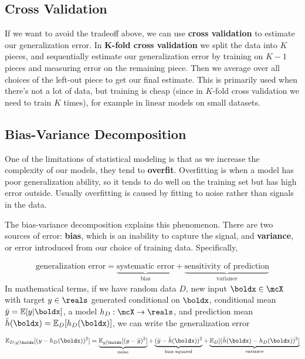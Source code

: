 \documentclass[12pt,letterpaper]{article}
\newcommand{\1}{\mathbbm{1}}
\begin{document}
\subsection{Cross Validation}
If we want to avoid the tradeoff above, we can use \textbf{cross validation} to estimate our generalization error. In \textbf{K-fold cross validation} we split the data into $K$ pieces, and sequentially estimate our generalization error by training on $K - 1$ pieces and measuring error on the remaining piece. Then we average over all choices of the left-out piece to get our final estimate. This is primarily used when there's not a lot of data, but training is cheap (since in $K$-fold cross validation we need to train $K$ times), for example in linear models on small datasets.

\subsection{Bias-Variance Decomposition}
One of the limitations of statistical modeling is that as we increase the complexity of our models, they tend to \textbf{overfit}. Overfitting is when a model has poor generalization ability, so it tends to do well on the training set but has high error outside. Usually overfitting is caused by fitting to noise rather than signals in the data.

The bias-variance decomposition explains this phenomenon. There are two sources of error: \textbf{bias}, which is an inability to capture the signal, and \textbf{variance}, or error introduced from our choice of training data. Specifically,

\begin{align}
\text{generalization error} = \underbrace{\text{systematic error}}_{\text{bias}} + \underbrace{\text{sensitivity of prediction}}_{\text{variance}}
\end{align}
In mathematical terms, if we have random data $D$, new input $\boldx \in \mcX$ with target $y \in \reals$ generated conditional on $\boldx$, conditional mean $\bar{y} = \mathbb{E}[y | \boldx]$, a model $h_D : \mcX \to \reals$, and prediction mean $\bar{h}(\boldx) = \mathbb{E}_D[h_D(\boldx)]$, we can write the generalization error

\begin{align}
\mathbb{E}_{D, y|\boldx}[(y - h_D(\boldx))^2] = \underbrace{\mathbb{E}_{y | \boldx}[(y - \bar{y})^2]}_{\text{noise}} + \underbrace{(\bar{y} - \bar{h}(\boldx))^2}_{\text{bias squared}} + \underbrace{\mathbb{E}_D[(\bar{h}(\boldx) - h_D(\boldx))^2]}_{\text{variance}}
\end{align}
\end{document}
